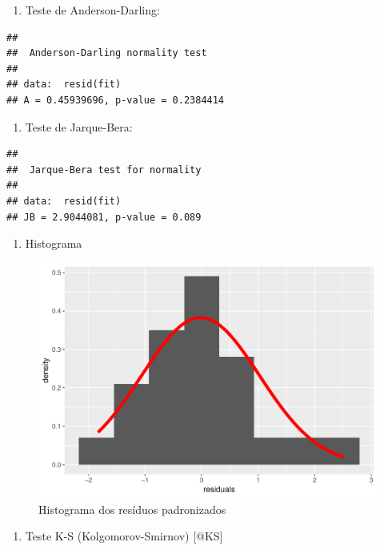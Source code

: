 \documentclass[]{article}
\providecommand{\tightlist}{%
  \setlength{\itemsep}{0pt}\setlength{\parskip}{0pt}}
\begin{document}
\begin{enumerate}
\def\labelenumi{\alph{enumi}.}
\setcounter{enumi}{3}
\tightlist
\item
  Teste de Anderson-Darling:
\end{enumerate}

\begin{verbatim}
## 
##  Anderson-Darling normality test
## 
## data:  resid(fit)
## A = 0.45939696, p-value = 0.2384414
\end{verbatim}

\begin{enumerate}
\def\labelenumi{\alph{enumi}.}
\setcounter{enumi}{4}
\tightlist
\item
  Teste de Jarque-Bera:
\end{enumerate}

\begin{verbatim}
## 
##  Jarque-Bera test for normality
## 
## data:  resid(fit)
## JB = 2.9044081, p-value = 0.089
\end{verbatim}

\newpage

\begin{enumerate}
\def\labelenumi{\alph{enumi}.}
\setcounter{enumi}{5}
\tightlist
\item
  Histograma
\end{enumerate}

\begin{figure}[H]

{\centering \includegraphics[width=0.45\linewidth]{Report_files/figure-latex/histograma-1} 

}

\caption{Histograma dos resíduos padronizados}\label{fig:histograma}
\end{figure}

\begin{enumerate}
\def\labelenumi{\alph{enumi}.}
\setcounter{enumi}{6}
\tightlist
\item
  Teste K-S (Kolgomorov-Smirnov) {[}@KS{]}
\end{enumerate}
\end{document}
